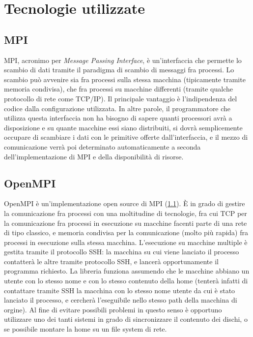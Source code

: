 \section{Tecnologie utilizzate}
\label{sec:tecnologie}
\subsection{MPI}
\label{subsec:mpi}
MPI, acronimo per \emph{Message Passing Interface}, è un'interfaccia che permette lo scambio di dati tramite il paradigma di scambio di messaggi fra processi. 
Lo scambio può avvenire sia fra processi sulla stessa macchina (tipicamente tramite memoria condivisa), che fra processi su macchine differenti (tramite qualche protocollo di rete come TCP/IP).
Il principale vantaggio è l'indipendenza del codice dalla configurazione utilizzata. In altre parole, il programmatore che utilizza questa interfaccia non ha bisogno di sapere quanti processori avrà a disposizione e su quante macchine essi siano distribuiti, si dovrà semplicemente occupare di scambiare i dati con le primitive offerte dall'interfaccia, e il mezzo di comunicazione verrà poi determinato automaticamente a seconda dell'implementazione di MPI e della disponibilità di risorse.
\subsection{OpenMPI}
\label{subsec:openmpi}
OpenMPI è un'implementazione open source di MPI (\ref{subsec:mpi}).
È in grado di gestire la comunicazione fra processi con una moltitudine di tecnologie, fra cui TCP per la comunicazione fra processi in esecuzione su macchine facenti parte di una rete di tipo classico, e memoria condivisa per la comunicazione (molto più rapida) fra processi in esecuzione sulla stessa macchina.
L'esecuzione su macchine multiple è gestita tramite il protocollo SSH: la macchina su cui viene lanciato il processo contatterà le altre tramite protocollo SSH, e lancerà opportunamente il programma richiesto.
La libreria funziona assumendo che le macchine abbiano un utente con lo stesso nome e con lo stesso contenuto della home (tenterà infatti di contattare tramite SSH la macchina con lo stesso nome utente da cui è stato lanciato il processo, e cercherà l'eseguibile nello stesso path della macchina di orgine).
Al fine di evitare possibili problemi in questo senso è opportuno utilizzare uno dei tanti sistemi in grado di sincronizzare il contenuto dei dischi, o se possibile montare la home su un file system di rete.

